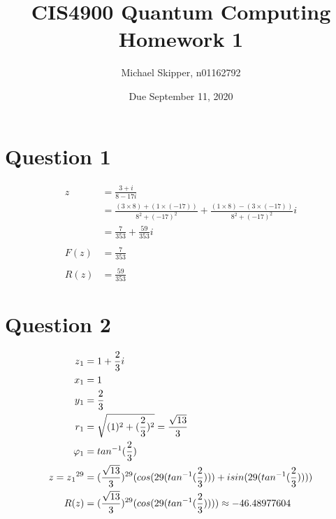 \documentclass{article}
\title{CIS4900 Quantum Computing Homework 1}
\author{Michael Skipper, n01162792}
\date{Due September 11, 2020}
\begin{document}
\maketitle




\section{Question 1}
\begin{align*} 
    z &= \frac{3+i}{8-17i} \\ 
    &= \frac{(3\times8) + (1\times(-17))}{8^2 + (-17)^2}
    + \frac{(1\times8) - (3\times(-17))}{8^2 + (-17)^2}i \\ 
    &= \frac{7}{353} + \frac{59}{353}i
    \\ \\
    F(z) &= \frac{7}{353} \\ \\ 
    R(z) &= \frac{59}{353}
\end{align*}



\section{Question 2} 
\begin{align*}
z\textsubscript1 &= 1 + \frac{2}{3}i \\
x\textsubscript1 &= 1 \\
y\textsubscript1 &= \frac{2}{3} \\
r\textsubscript1 &= \sqrt{(1)^2 + (\frac{2}{3})^2} = \frac{\sqrt{13}}{3} \\
\varphi\textsubscript1 &= tan^{-1}(\frac{2}{3}) \\ 
z = z\textsubscript1^{29} &= (\frac{\sqrt{13}}{3})^{29}(cos(29(tan^{-1}(\frac{2}{3}))) + isin(29(tan^{-1}(\frac{2}{3})))) \\
R(z) &= (\frac{\sqrt{13}}{3})^{29}(cos(29(tan^{-1}(\frac{2}{3})))) \approx -46.48977604
\end{align*}
\end{document}
